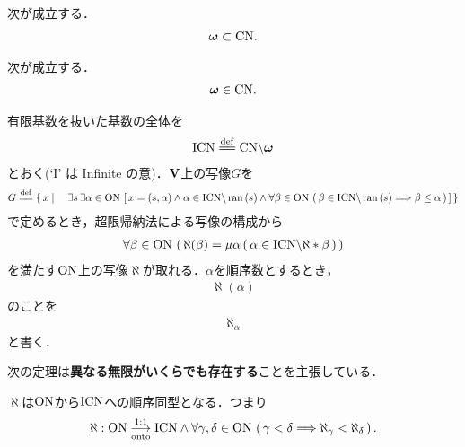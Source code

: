 	\begin{screen}
		\begin{thm}[自然数は基数]
			次が成立する．
			\begin{align}
				{\boldsymbol \omega} \subset \mathrm{CN}.
			\end{align}
		\end{thm}
	\end{screen}
	
	\begin{screen}
		\begin{thm}[$\Natural$は基数]
			次が成立する．
			\begin{align}
				{\boldsymbol \omega} \in \mathrm{CN}.
			\end{align}
		\end{thm}
	\end{screen}
	
	\begin{screen}
		\begin{dfn}[$\aleph$]
			有限基数を抜いた基数の全体を
			\begin{align}
				\InfCN \defeq \CN \backslash \Natural
			\end{align}
			とおく(`I' は Infinite の意)．$\mathbf{V}$上の写像$G$を
			\begin{align}
				G \defeq \Set{x}{\exists s\, \exists \alpha \in \ON\, 
				\left[\, x=(s,\alpha) \wedge \alpha \in \InfCN \backslash \ran{s} \wedge
				\forall \beta \in \ON\, \left(\, \beta \in \InfCN \backslash \ran{s}
				\Longrightarrow \beta \leq \alpha\, \right)\, \right]}
			\end{align}
			で定めるとき，超限帰納法による写像の構成から
			\begin{align}
				\forall \beta \in \mathrm{ON}\, 
				\left(\, \aleph(\beta) = \mu \alpha\, (\, \alpha \in \mathrm{ICN} \backslash \aleph \ast \beta\, )\, \right)
			\end{align}
			を満たす$\mathrm{ON}$上の写像$\aleph$が取れる．$\alpha$を順序数とするとき，
			\begin{align}
				\aleph(\alpha)
			\end{align}
			のことを
			\begin{align}
				\aleph_\alpha
			\end{align}
			と書く．
		\end{dfn}
	\end{screen}
	
	次の定理は{\bf 異なる無限がいくらでも存在する}ことを主張している．
	
	\begin{screen}
		\begin{thm}
			$\aleph$は$\mathrm{ON}$から$\mathrm{ICN}$への順序同型となる．つまり
			\begin{align}
				\aleph:\mathrm{ON} \underset{\mathrm{onto}}{\overset{\mathrm{1:1}}{\longrightarrow}} \mathrm{ICN} \wedge \forall \gamma, \delta \in \mathrm{ON}\, \left(\, \gamma < \delta
				\Longrightarrow \aleph_\gamma < \aleph_\delta\, \right).
			\end{align}
		\end{thm}
	\end{screen}
	
